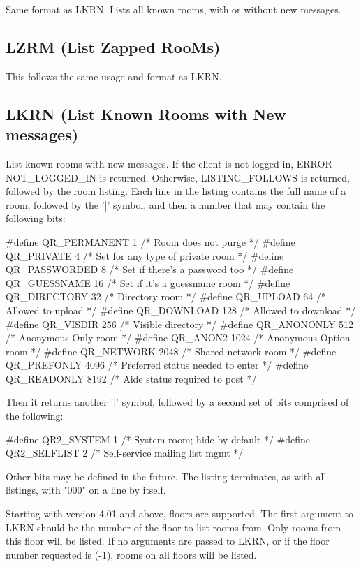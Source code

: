  Same format as LKRN.  Lists all known rooms, with or without new messages.



\subsection{LZRM (List Zapped RooMs)}

 This follows the same usage and format as LKRN.



\subsection{LKRN (List Known Rooms with New messages)}

 List known rooms with new messages.  If the client is not logged in, ERROR +
NOT_LOGGED_IN is returned.  Otherwise, LISTING_FOLLOWS is returned, followed
by the room listing.  Each line in the listing contains the full name of a
room, followed by the '|' symbol, and then a number that may contain the
following bits:

\#define QR_PERMANENT	1		/* Room does not purge              */
\#define QR_PRIVATE	4		/* Set for any type of private room */
\#define QR_PASSWORDED	8		/* Set if there's a password too    */
\#define QR_GUESSNAME	16		/* Set if it's a guessname room     */
\#define QR_DIRECTORY	32		/* Directory room                   */
\#define QR_UPLOAD	64		/* Allowed to upload                */
\#define QR_DOWNLOAD	128		/* Allowed to download              */
\#define QR_VISDIR	256		/* Visible directory                */
\#define QR_ANONONLY	512		/* Anonymous-Only room              */
\#define QR_ANON2	1024		/* Anonymous-Option room            */
\#define QR_NETWORK	2048		/* Shared network room              */
\#define QR_PREFONLY	4096		/* Preferred status needed to enter */
\#define QR_READONLY	8192		/* Aide status required to post     */

 Then it returns another '|' symbol, followed by a second set of bits comprised
of the following:

\#define QR2_SYSTEM	1		/* System room; hide by default     */
\#define QR2_SELFLIST	2		/* Self-service mailing list mgmt   */

 Other bits may be defined in the future.  The listing terminates, as with
all listings, with "000" on a line by itself.

 Starting with version 4.01 and above, floors are supported.  The first
argument to LKRN should be the number of the floor to list rooms from.  Only
rooms from this floor will be listed.  If no arguments are passed to LKRN, or
if the floor number requested is (-1), rooms on all floors will be listed.


